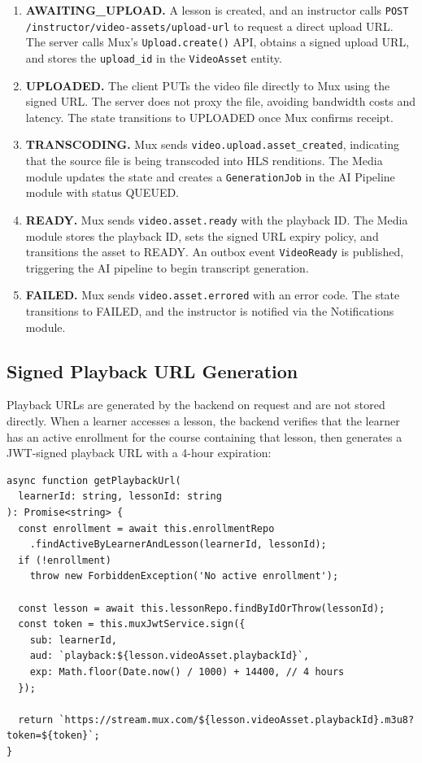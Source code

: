 \begin{enumerate}
  \item \textbf{AWAITING\_UPLOAD.} A lesson is created, and an instructor calls \texttt{POST /instructor/video-assets/upload-url} to request a direct upload URL. The server calls Mux's \texttt{Upload.create()} API, obtains a signed upload URL, and stores the \texttt{upload\_id} in the \texttt{VideoAsset} entity.
  \item \textbf{UPLOADED.} The client PUTs the video file directly to Mux using the signed URL. The server does not proxy the file, avoiding bandwidth costs and latency. The state transitions to UPLOADED once Mux confirms receipt.
  \item \textbf{TRANSCODING.} Mux sends \texttt{video.upload.asset\_created}, indicating that the source file is being transcoded into HLS renditions. The Media module updates the state and creates a \texttt{GenerationJob} in the AI Pipeline module with status QUEUED.
  \item \textbf{READY.} Mux sends \texttt{video.asset.ready} with the playback ID. The Media module stores the playback ID, sets the signed URL expiry policy, and transitions the asset to READY. An outbox event \texttt{VideoReady} is published, triggering the AI pipeline to begin transcript generation.
  \item \textbf{FAILED.} Mux sends \texttt{video.asset.errored} with an error code. The state transitions to FAILED, and the instructor is notified via the Notifications module.
\end{enumerate}

\subsection{Signed Playback URL Generation}

Playback URLs are generated by the backend on request and are not stored directly. When a learner accesses a lesson, the backend verifies that the learner has an active enrollment for the course containing that lesson, then generates a JWT-signed playback URL with a 4-hour expiration:

\begin{lstlisting}[caption=Generating a Signed Mux Playback URL,label=lst:signed-url]
async function getPlaybackUrl(
  learnerId: string, lessonId: string
): Promise<string> {
  const enrollment = await this.enrollmentRepo
    .findActiveByLearnerAndLesson(learnerId, lessonId);
  if (!enrollment)
    throw new ForbiddenException('No active enrollment');

  const lesson = await this.lessonRepo.findByIdOrThrow(lessonId);
  const token = this.muxJwtService.sign({
    sub: learnerId,
    aud: `playback:${lesson.videoAsset.playbackId}`,
    exp: Math.floor(Date.now() / 1000) + 14400, // 4 hours
  });

  return `https://stream.mux.com/${lesson.videoAsset.playbackId}.m3u8?token=${token}`;
}
\end{lstlisting}

